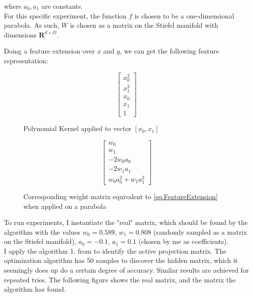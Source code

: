 where $a_0, a_1$ are constants. \\

For this specific experiment, the function $f$ is chosen to be a one-dimensional parabola. 
As such, $W$ is chosen as a matrix on the Stiefel manifold with dimensions $\mathbf{R}^{d \times D}$.

Doing a feature extension over $x$ and $y$, we can get the following feature representation:

\def\PHI{
\begin{bmatrix}
    x_0^2 \\
    x_1^2 \\
    x_0 \\
    x_1 \\
    1
\end{bmatrix}}


\def\WtoPhi{
\begin{bmatrix}
    w_0 \\
    w_1 \\
    -2 w_0 a_0 \\
    -2 w_1 a_1 \\
    w_0 a_0^2 + w_1 a_1^2
\end{bmatrix}}

\begin{figure}[h]

\begin {minipage}{0.47\textwidth}
  \centering
  \begin{equation}
    \PHI
  \end{equation}
  \caption{Polynomial Kernel applied to vector $[x_0, x_1]$}
\end{minipage}
\hfill
\begin {minipage}{0.47\textwidth}
  \centering
  \begin{equation}
    \WtoPhi
  \end{equation}
  \caption{Corresponding weight matrix equivalent to \ref{eq:FeatureExtension} when applied on a parabola}
\end{minipage}

\end{figure}

To run experiments, I instantiate the "real" matrix, which should be found by the algorithm with the values $w_0 = 0.589$, $w_1 = 0.808$ (randomly sampled as a matrix on the Stiefel manifold), $a_0 = -0.1$, $a_1 = 0.1$ (chosen by me as coefficients). \\

I apply the algorithm 1. from \citep{Tripathy} to identify the active projection matrix.
The optimization algorithm has 50 samples to discover the hidden matrix, which it seemingly does up do a certain degree of accuracy.
Similar results are achieved for repeated tries.
The following figure shows the real matrix, and the matrix the algorithm has found.

